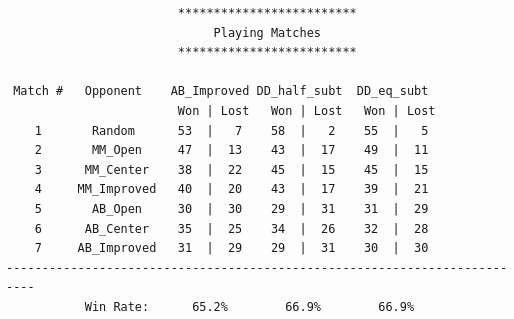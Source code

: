 \documentclass[a4paper,12pt]{article}
\begin{document}
\begin{verbatim}
                        *************************                         
                             Playing Matches                              
                        *************************                         

 Match #   Opponent    AB_Improved DD_half_subt  DD_eq_subt  
                        Won | Lost   Won | Lost   Won | Lost 
    1       Random      53  |   7    58  |   2    55  |   5  
    2       MM_Open     47  |  13    43  |  17    49  |  11  
    3      MM_Center    38  |  22    45  |  15    45  |  15  
    4     MM_Improved   40  |  20    43  |  17    39  |  21  
    5       AB_Open     30  |  30    29  |  31    31  |  29  
    6      AB_Center    35  |  25    34  |  26    32  |  28  
    7     AB_Improved   31  |  29    29  |  31    30  |  30  
--------------------------------------------------------------------------
           Win Rate:      65.2%        66.9%        66.9%  

\end{verbatim}
\end{document}

